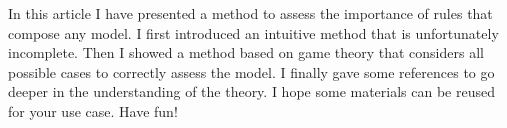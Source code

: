 In this article I have presented a method to assess the importance of rules that compose any model. I first introduced an intuitive method that is unfortunately incomplete. Then I showed a method based on game theory that considers all possible cases to correctly assess the model. I finally gave some references to go deeper in the understanding of the theory. I hope some materials can be reused for your use case. Have fun!


\vspace{10mm}